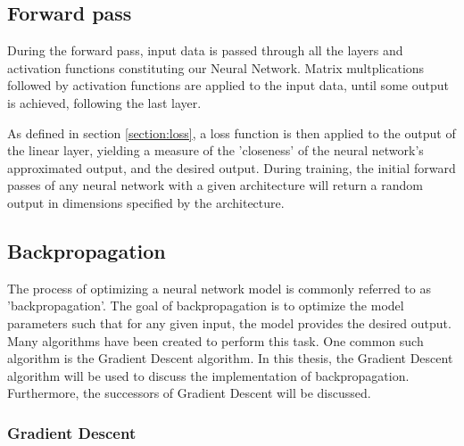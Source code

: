 \subsection{Forward pass}

During the forward pass, input data is passed through all the layers and activation functions constituting our Neural Network. 
Matrix multplications followed by activation functions are applied to the input data, until some output is achieved, following the last layer.

As defined in section \ref{section:loss}, a loss function is then applied to the output of the linear layer, yielding a measure of the 'closeness' of the neural network's approximated output, and the desired output.
During training, the initial forward passes of any neural network with a given architecture will return a random output in dimensions specified by the architecture.



\subsection{Backpropagation}
\label{subsection:backpropagation}

The process of optimizing a neural network model is commonly referred to as 'backpropagation'.
The goal of backpropagation is to optimize the model parameters such that for any given input,
the model provides the desired output. Many algorithms have been created to perform this task.
One common such algorithm is the Gradient Descent algorithm. In this thesis, 
the Gradient Descent algorithm will be used to discuss the implementation of backpropagation.
Furthermore, the successors of Gradient Descent will be discussed.

\subsubsection{Gradient Descent}

